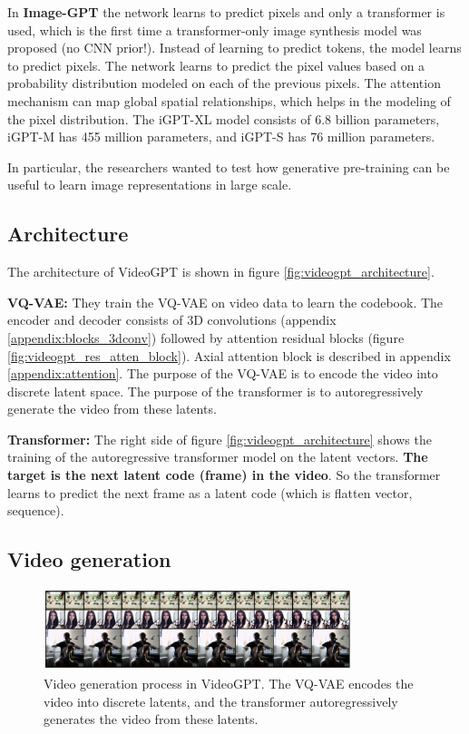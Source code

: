 In \textbf{Image-GPT} the network learns to predict pixels and only a transformer is used, which is the first time a transformer-only image synthesis model was proposed (no CNN prior!). Instead of learning to predict tokens, the model learns to predict pixels. The network learns to predict the pixel values based on a probability distribution modeled on each of the previous pixels. The attention mechanism can map global spatial relationships, which helps in the modeling of the pixel distribution. The iGPT-XL model consists of 6.8 billion parameters, iGPT-M has 455 million parameters, and iGPT-S has 76 million parameters. 

In particular, the researchers wanted to test how generative pre-training can be useful to learn image representations in large scale.






\subsection{Architecture}

The architecture of VideoGPT is shown in figure \ref{fig:videogpt_architecture}.

\textbf{VQ-VAE:} They train the VQ-VAE on video data to learn the codebook. The encoder and decoder consists of 3D convolutions (appendix \ref{appendix:blocks_3dconv}) followed by attention residual blocks (figure \ref{fig:videogpt_res_atten_block}). Axial attention \cite{axial_attention} block is described in appendix \ref{appendix:attention}. The purpose of the VQ-VAE is to encode the video into discrete latent space. The purpose of the transformer is to autoregressively generate the video from these latents.

\textbf{Transformer:} The right side of figure \ref{fig:videogpt_architecture} shows the training of the autoregressive transformer model on the latent vectors. \textbf{The target is the next latent code (frame) in the video}. So the transformer learns to predict the next frame as a latent code (which is flatten vector, sequence).




\subsection{Video generation}

\begin{figure}
    \centering
    \includegraphics[width=0.8\textwidth]{images/video_gpt/video_generation.png}
    \caption{Video generation process in VideoGPT. The VQ-VAE encodes the video into discrete latents, and the transformer autoregressively generates the video from these latents.}
    \label{fig:videogpt_video_generation}
\end{figure}

